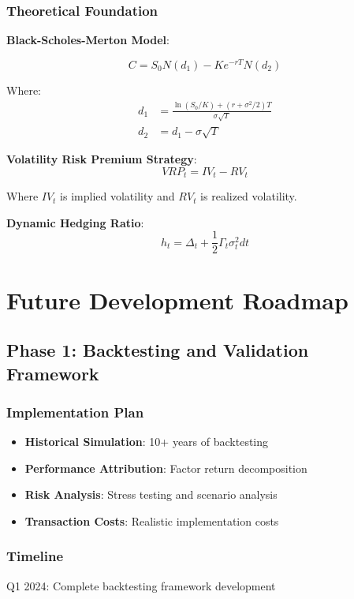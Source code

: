 \documentclass[12pt,a4paper]{article}
\begin{document}
\subsubsection{Theoretical Foundation}
\textbf{Black-Scholes-Merton Model}:

\begin{equation}
C = S_0 N(d_1) - Ke^{-rT} N(d_2)
\end{equation}

Where:
\begin{align}
d_1 &= \frac{\ln(S_0/K) + (r + \sigma^2/2)T}{\sigma\sqrt{T}} \\
d_2 &= d_1 - \sigma\sqrt{T}
\end{align}

\textbf{Volatility Risk Premium Strategy}:
\begin{equation}
VRP_t = IV_t - RV_t
\end{equation}

Where $IV_t$ is implied volatility and $RV_t$ is realized volatility.

\textbf{Dynamic Hedging Ratio}:
\begin{equation}
h_t = \Delta_t + \frac{1}{2}\Gamma_t \sigma_t^2 dt
\end{equation}

\section{Future Development Roadmap}

\subsection{Phase 1: Backtesting and Validation Framework}

\subsubsection{Implementation Plan}
\begin{itemize}
    \item \textbf{Historical Simulation}: 10+ years of backtesting
    \item \textbf{Performance Attribution}: Factor return decomposition
    \item \textbf{Risk Analysis}: Stress testing and scenario analysis
    \item \textbf{Transaction Costs}: Realistic implementation costs
\end{itemize}

\subsubsection{Timeline}
Q1 2024: Complete backtesting framework development
\end{document}
